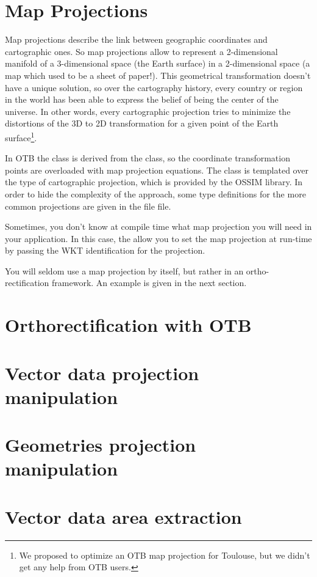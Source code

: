 

\section{Map Projections}
\ifitkFullVersion
\label{sec:MapProjections}
\fi

Map projections describe the link between geographic coordinates and
cartographic ones. So map projections allow to represent a 2-dimensional manifold of a
3-dimensional space (the Earth surface) in a 2-dimensional space (a
map which used to be a sheet of paper!). This geometrical
transformation doesn't have a unique solution, so over the cartography
history, every country or region in the world has been able to express
the belief of being the center of the universe. In other words, every
cartographic projection tries to minimize the distortions of the 3D to
2D transformation for a given point of the Earth surface\footnote{We
  proposed to optimize an OTB map projection for Toulouse, but we
  didn't get any help from OTB users.}.

In OTB the  class is derived from the
 class, so the coordinate transformation
points are overloaded with map projection equations. The
 class is templated over the type of
cartographic projection, which is provided by the OSSIM library. In
order to hide the complexity of the approach, some type definitions
for the more common projections are given in the file
 file.

Sometimes, you don't know at compile time what map projection you will need in
your application. In this case, the 
allow you to set the map projection at run-time by passing the WKT identification
for the projection.



You will seldom use a map projection by itself, but rather in an
ortho-rectification framework. An example is given in the next section.




\section{Orthorectification with OTB}
\ifitkFullVersion
\label{sec:OrthorectificationwithOTB}
\fi


\section{Vector data projection manipulation}
\ifitkFullVersion
\label{sec:VectorDataProjection}
\fi


\section{Geometries projection manipulation}
\ifitkFullVersion
\label{sec:GeometriesProjection}
\fi


\section{Vector data area extraction}
\ifitkFullVersion
\label{sec:VectorDataAreaExtraction}
\fi

